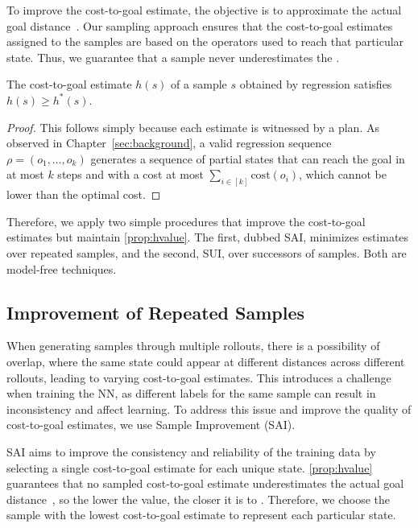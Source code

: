 To improve the cost-to-goal estimate, the objective is to approximate the actual goal distance~\hstar. Our sampling approach ensures that the cost-to-goal estimates assigned to the samples are based on the operators used to reach that particular state. Thus, we guarantee that a sample never underestimates the \hstar.

\begin{property}
    \label{prop:hvalue}
    The cost-to-goal estimate $h(s)$ of a sample $s$ obtained by regression satisfies $h(s)\geq h^*(s)$.
\end{property}
\begin{proof}
    This follows simply because each estimate is witnessed by a plan. As observed in Chapter~\ref{sec:background}, a valid regression sequence $\rho=(o_1,\ldots,o_k)$ generates a sequence of partial states that can reach the goal in at most $k$ steps and with a cost at most $\sum_{i\in[k]}\text{cost}(o_i)$, which cannot be lower than the optimal cost.
\end{proof}

Therefore, we apply two simple procedures that improve the cost-to-goal estimates but maintain \cref{prop:hvalue}. The first, dubbed SAI, minimizes estimates over repeated samples, and the second, SUI, over successors of samples. Both are model-free techniques.

\subsection{Improvement of Repeated Samples}
\label{sec:hmin} 

When generating samples through multiple rollouts, there is a possibility of overlap, where the same state could appear at different distances across different rollouts, leading to varying cost-to-goal estimates. This introduces a challenge when training the NN, as different labels for the same sample can result in inconsistency and affect learning. To address this issue and improve the quality of cost-to-goal estimates, we use Sample Improvement (SAI).

SAI aims to improve the consistency and reliability of the training data by selecting a single cost-to-goal estimate for each unique state. \cref{prop:hvalue} guarantees that no sampled cost-to-goal estimate underestimates the actual goal distance~\hstar, so the lower the value, the closer it is to \hstar. Therefore, we choose the sample with the lowest cost-to-goal estimate to represent each particular state.

